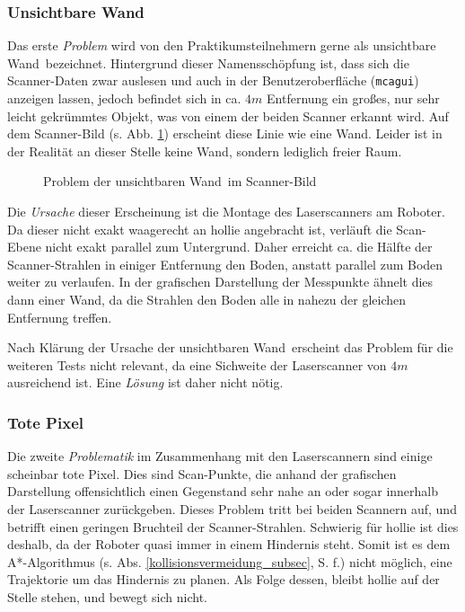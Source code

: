 \subsubsection{\glqq Unsichtbare Wand\grqq}

Das erste \emph{Problem} wird von den Praktikumsteilnehmern gerne als \glqq unsichtbare Wand\grqq\ bezeichnet.
Hintergrund dieser Namensschöpfung ist, dass sich die Scanner-Daten zwar auslesen und auch in der Benutzeroberfläche (\lstinline{mcagui}) anzeigen lassen, jedoch befindet sich in ca. $4m$ Entfernung ein großes, nur sehr leicht gekrümmtes Objekt, was von einem der beiden Scanner erkannt wird.
Auf dem Scanner-Bild (s. Abb. \ref{fig:scanner_problem}) erscheint diese Linie wie eine Wand.
Leider ist in der Realität an dieser Stelle keine Wand, sondern lediglich freier Raum.

\begin{figure}[h]
	\centering
	\caption{Problem der \glqq unsichtbaren Wand\grqq\ im Scanner-Bild}
	\label{fig:scanner_problem}
\end{figure}

Die \emph{Ursache} dieser Erscheinung ist die Montage des Laserscanners am Roboter.
Da dieser nicht exakt waagerecht an \gls{hollie} angebracht ist, verläuft die Scan-Ebene nicht exakt parallel zum Untergrund.
Daher erreicht ca. die Hälfte der Scanner-Strahlen in einiger Entfernung den Boden, anstatt parallel zum Boden weiter zu verlaufen.
In der grafischen Darstellung der Messpunkte ähnelt dies dann einer Wand, da die Strahlen den Boden alle in nahezu der gleichen Entfernung treffen.

Nach Klärung der Ursache der \glqq unsichtbaren Wand\grqq\ erscheint das Problem für die weiteren Tests nicht relevant, da eine Sichweite der Laserscanner von $4m$ ausreichend ist.
Eine \emph{Lösung} ist daher nicht nötig.


\subsubsection{\glqq Tote Pixel\grqq}

Die zweite \emph{Problematik} im Zusammenhang mit den Laserscannern sind einige scheinbar \glqq tote Pixel\grqq.
Dies sind Scan-Punkte, die anhand der grafischen Darstellung offensichtlich einen Gegenstand sehr nahe an oder sogar innerhalb der Laserscanner zurückgeben.
Dieses Problem tritt bei beiden Scannern auf, und betrifft einen geringen Bruchteil der Scanner-Strahlen.
Schwierig für \gls{hollie} ist dies deshalb, da der Roboter quasi immer in einem Hindernis steht.
Somit ist es dem A*-Algorithmus (s. Abs. \ref{kollisionsvermeidung_subsec}, S. \pageref{kollisionsvermeidung_subsec} f.) nicht möglich, eine Trajektorie um das Hindernis zu planen.
Als Folge dessen, bleibt \gls{hollie} auf der Stelle stehen, und bewegt sich nicht.

